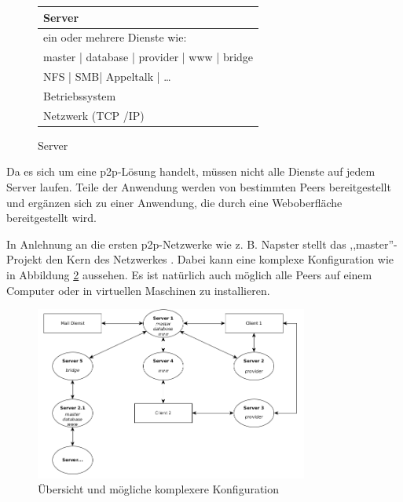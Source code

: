 \documentclass[oneside, ngerman, toc=bibliography,bibliography=totoc,listof=entryprefix, open=right,numbers=noenddot,fontsize=12pt]{scrbook}
\begin{document}
 \begin{figure}[htbp] 
     \centering 
     \begin{tabular}{|p{}|}
         \hline
         Server\\ \hline\hline
         ein oder mehrere Dienste wie:\\
         master  | database | provider | www | bridge\\ \hline\hline
         NFS | SMB| Appeltalk | \ldots \\ \hline
         Betriebssystem \\ \hline
         Netzwerk (TCP /IP) \\ \hline
        \end{tabular}
        
        \caption{Server}
        \label{fig:xist-server}
        
    \end{figure}   
    
 
Da es sich um eine \acrshort{p2p}-Lösung handelt, müssen nicht alle Dienste auf jedem Server laufen. 
Teile der Anwendung werden von bestimmten Peers bereitgestellt und ergänzen sich zu einer Anwendung, die durch eine Weboberfläche bereitgestellt wird.


In Anlehnung an die ersten \acrshort{p2p}-Netzwerke wie z. B. Napster stellt das ,,master''-Projekt den Kern des Netzwerkes \cite{mahlmann2007peer}.
Dabei kann eine komplexe Konfiguration wie in Abbildung \ref{fig:app-outline} aussehen. Es ist natürlich auch möglich alle Peers auf einem Computer oder in virtuellen Maschinen zu installieren.

\begin{figure}[htbp] 
    \centering
    \includegraphics[width=0.8\textwidth]{Masterarbeit_Bilder/clients_uebersicht.png}
    \caption{Übersicht und mögliche komplexere Konfiguration}
    \label{fig:app-outline}
\end{figure}  
\end{document}
